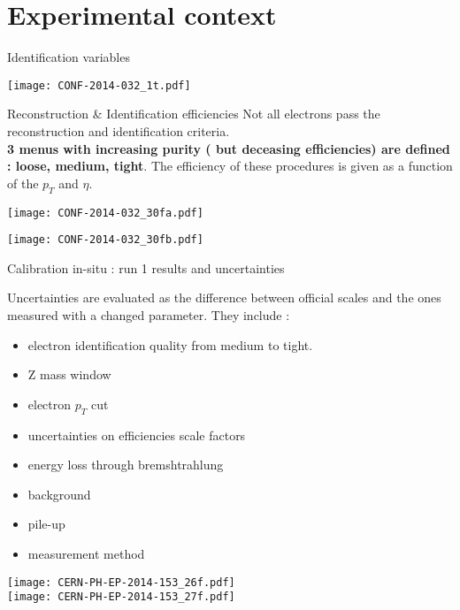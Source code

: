 \section{Experimental context}
\begin{frame}{Identification variables}
  \begin{center}
\texttt{[image: CONF-2014-032\_1t.pdf]}
\end{center}
\end{frame}

\begin{frame}{Reconstruction \& Identification efficiencies}
  Not all electrons pass the reconstruction and identification criteria. \\
  {\bf 3 menus with increasing purity ( but deceasing efficiencies) are defined : loose, medium, tight}.
  The efficiency of these procedures is given as a function of the $p_T$ and $\eta$.\\
\begin{minipage}{0.49\linewidth}
  \texttt{[image: CONF-2014-032\_30fa.pdf]}
\end{minipage}
\begin{minipage}{0.49\linewidth}
  \texttt{[image: CONF-2014-032\_30fb.pdf]}
\end{minipage}
\end{frame}


\begin{frame}{Calibration in-situ : run 1  results and uncertainties}
\begin{minipage}{0.64\linewidth}
  Uncertainties are evaluated as the difference between official scales and the ones measured with a changed parameter. 
  They include :
  \begin{itemize}
  \item electron identification quality from medium to tight.
  \item Z mass window 
  \item electron $p_T$ cut
  \item uncertainties on efficiencies scale factors
  \item energy loss through bremshtrahlung
  \item background
  \item pile-up
  \item measurement method
  \end{itemize}
\end{minipage}
\begin{minipage}{0.35\linewidth}
    \texttt{[image: CERN-PH-EP-2014-153\_26f.pdf]}\\
    \texttt{[image: CERN-PH-EP-2014-153\_27f.pdf]}
\end{minipage}
\end{frame}
